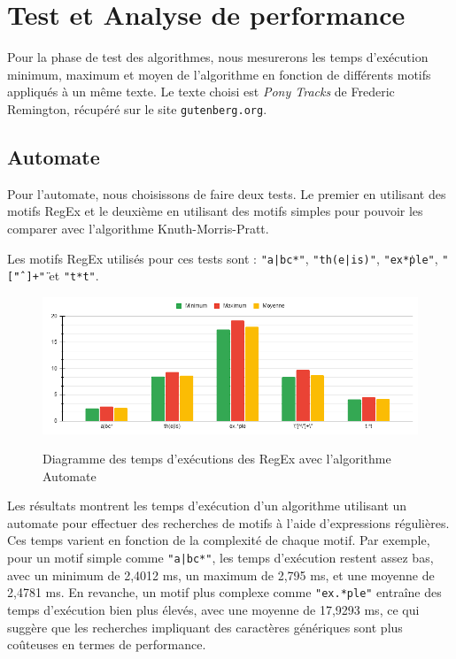 \documentclass{article}
\begin{document}
\newpage
\section{Test et Analyse de performance}

Pour la phase de test des algorithmes, nous mesurerons les temps d'exécution minimum, maximum et moyen de l'algorithme en fonction de différents motifs appliqués à un même texte. Le texte choisi est \textit{Pony Tracks} de Frederic Remington, récupéré sur le site \texttt{gutenberg.org}.

\subsection{Automate}

Pour l’automate, nous choisissons de faire deux tests. Le premier en utilisant des motifs RegEx et le deuxième en utilisant des motifs simples pour pouvoir les comparer avec l’algorithme Knuth-Morris-Pratt.

Les motifs RegEx utilisés pour ces tests sont : \texttt{"a|bc*"}, \texttt{"th(e|is)"}, \texttt{"ex\.*ple"}, \texttt{"\"[\^  " ]+\""} et \texttt{"t\.*t"}.

\begin{figure}[ht] %
    \centering
    \includegraphics[width=1\textwidth]{./ressources/test_automate_regex.png}
    \caption{Diagramme des temps d'exécutions des RegEx avec l'algorithme Automate}
    \cite{test_automate_regex}
    \label{fig:test_automate_regex}
\end{figure}

Les résultats montrent les temps d'exécution d'un algorithme utilisant un automate pour effectuer des recherches de motifs à l'aide d'expressions régulières. Ces temps varient en fonction de la complexité de chaque motif. Par exemple, pour un motif simple comme \texttt{"a|bc*"}, les temps d'exécution restent assez bas, avec un minimum de 2,4012 ms, un maximum de 2,795 ms, et une moyenne de 2,4781 ms. En revanche, un motif plus complexe comme \texttt{"ex.*ple"} entraîne des temps d'exécution bien plus élevés, avec une moyenne de 17,9293 ms, ce qui suggère que les recherches impliquant des caractères génériques sont plus coûteuses en termes de performance.
\end{document}
